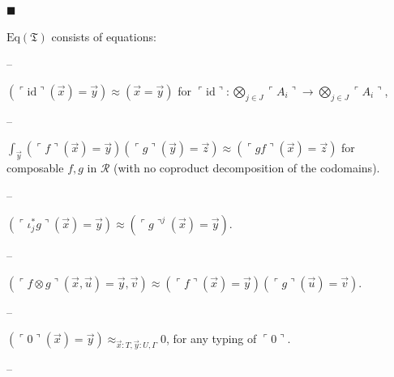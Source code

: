 \documentclass[10pt,a4paper]{amsart}
\begin{document}
 
 
\par\noindent  $\blacksquare$ 
 
$\mathrm{Eq}(\mathfrak{T})$ consists of equations:\par
  
\par\noindent  – 
 
$\left(\ulcorner\mathrm{id}\urcorner(\vec{x})=\vec{y}\right)\approx(\vec{x}=%
\vec{y})$ for $\ulcorner\mathrm{id}\urcorner:\bigotimes_{j\in J}\ulcorner A_{i}\urcorner\to%
\bigotimes_{j\in J}\ulcorner A_{i}\urcorner$,\par
 
 
 
\par\noindent  – 
 
$\int_{\vec{y}}(\ulcorner f\urcorner(\vec{x})=\vec{y})(\ulcorner g\urcorner(%
\vec{y})=\vec{z})\approx(\ulcorner gf\urcorner(\vec{x})=\vec{z})$ for composable $f,g$ in $\mathcal{R}$ (with no coproduct decomposition of the codomains).\par
 
 
 
\par\noindent  – 
 
$(\ulcorner\iota^{*}_{j}g\urcorner(\vec{x})=\vec{y})\approx(\ulcorner g%
\urcorner^{j}(\vec{x})=\vec{y})$.\par
 
 
 
\par\noindent  – 
 
$(\ulcorner f\otimes g\urcorner(\vec{x},\vec{u})=\vec{y},\vec{v})\approx(%
\ulcorner f\urcorner(\vec{x})=\vec{y})(\ulcorner g\urcorner(\vec{u})=\vec{v})$.\par
 
 
 
\par\noindent  – 
 
$(\ulcorner 0\urcorner(\vec{x})=\vec{y})\approx_{\vec{x}:T,\vec{y}:U,\Gamma}0$, for any typing of $\ulcorner 0\urcorner$.\par
 
 
 
\par\noindent  – 
 
\end{document}
